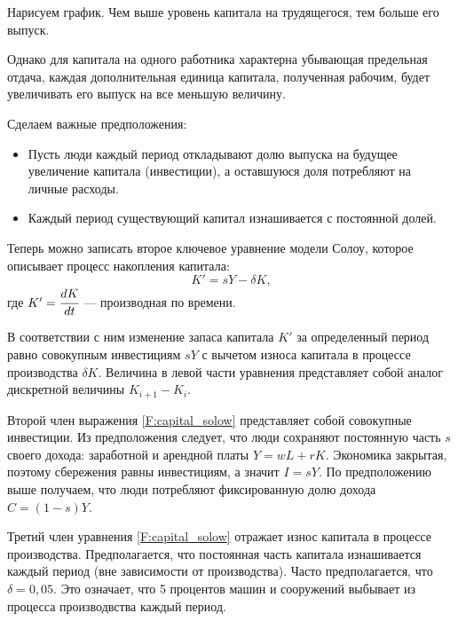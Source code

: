 Нарисуем график.
Чем выше уровень капитала на трудящегося, тем больше его выпуск.

\begin{center}
\end{center}
Однако для капитала на одного работника характерна убывающая предельная отдача, каждая дополнительная единица капитала, полученная рабочим, будет увеличивать его выпуск на все меньшую величину.

Сделаем важные предположения:
\begin{itemize}
	\item Пусть люди каждый период откладывают долю выпуска на будущее увеличение капитала (инвестиции), а оставшуюся доля потребляют на личные расходы.
	\item Каждый период существующий капитал  изнашивается с постоянной долей.
\end{itemize}

Теперь можно записать второе ключевое уравнение модели Солоу, которое описывает процесс накопления капитала:
\begin{equation}
K' = sY-\delta K \text{,}
\label{F:capital_solow}
\end{equation}
где $K' = \cfrac{dK}{dt}$ --- производная по времени.

В соответствии с ним изменение запаса капитала $K'$ за определенный период равно совокупным инвестициям $sY$ с вычетом износа капитала в процессе производства $\delta K$.
Величина в левой части уравнения представляет собой аналог дискретной величины $K_{i+1} - K_{i}$.

Второй член выражения \ref {F:capital_solow} представляет собой совокупные инвестиции.
Из предположения следует, что люди сохраняют постоянную часть $s$ своего дохода: заработной и арендной платы $Y=wL+rK$.
Экономика закрытая, поэтому сбережения равны инвестициям, а значит $I=sY$.
По предположению выше получаем, что люди потребляют фиксированную долю дохода $C=(1-s)Y$.

Третий член уравнения \ref {F:capital_solow} отражает износ капитала в процессе производства.
Предполагается, что постоянная часть капитала изнашивается каждый период (вне зависимости от производства).
Часто предполагается, что $\delta = 0,05$.
Это означает, что 5 процентов машин и сооружений выбывает из процесса производвства каждый период.

